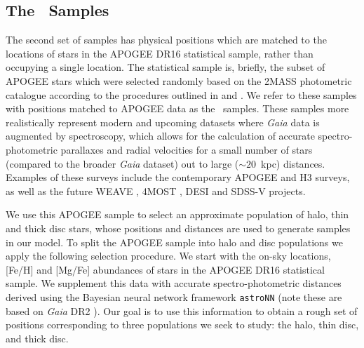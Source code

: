 \subsection{The \survey\ Samples}
\label{subsec:TheSurveySamples}

The second set of samples has physical positions which are matched to the locations of stars in the APOGEE DR16 \parencite{apogeedr16} statistical sample, rather than occupying a single location. The statistical sample is, briefly, the subset of APOGEE stars which were selected randomly based on the 2MASS photometric catalogue according to the procedures outlined in \textcite[][APOGEE-1]{zasowski13} and \textcite[][APOGEE-2]{zasowski17}. We refer to these samples with positions matched to APOGEE data as the \survey\ samples. These samples more realistically represent modern and upcoming datasets where \textit{Gaia} data is augmented by spectroscopy, which allows for the calculation of accurate spectro-photometric parallaxes \parencite[e.g.,][]{leung19b} and radial velocities for a small number of stars (compared to the broader \textit{Gaia} dataset) out to large ($\sim 20$~kpc) distances. Examples of these surveys include the contemporary APOGEE \parencite{apogeedr16} and H3 \parencite{h3} surveys, as well as the future WEAVE \parencite{weave}, 4MOST \parencite{4most}, DESI \parencite{desi} and SDSS-V \parencite{sdss5} projects.

We use this APOGEE sample to select an approximate population of halo, thin and thick disc stars, whose positions and distances are used to generate samples in our model. To split the APOGEE sample into halo and disc populations we apply the following selection procedure. We start with the on-sky locations, [Fe/H] and [Mg/Fe] abundances of stars in the APOGEE DR16 statistical sample. We supplement this data with accurate spectro-photometric distances derived using the Bayesian neural network framework \texttt{astroNN} \parencite{leung19a,leung19b} (note these are based on \textit{Gaia} DR2 \parencite{gaiadr2}). Our goal is to use this information to obtain a rough set of positions corresponding to three populations we seek to study: the halo, thin disc, and thick disc.

